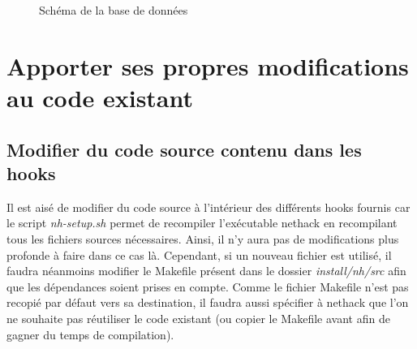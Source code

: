 \documentclass[10pt,a4paper]{report}
\begin{document}
\begin{figure}[H]
	\caption{\label{fig:database} Schéma de la base de données}
\end{figure}

\chapter{Apporter ses propres modifications au code existant}
\section{Modifier du code source contenu dans les hooks}
Il est aisé de modifier du code source à l'intérieur des différents hooks
fournis car le script \emph{nh-setup.sh} permet de recompiler l'exécutable
nethack en recompilant tous les fichiers sources nécessaires. Ainsi, il n'y aura
pas de modifications plus profonde à faire dans ce cas là. Cependant, si un
nouveau fichier est utilisé, il faudra néanmoins modifier le Makefile présent
dans le dossier \emph{install/nh/src} afin que les dépendances soient prises en
compte. Comme le fichier Makefile n'est pas recopié par défaut vers sa
destination, il faudra aussi spécifier à nethack que l'on ne souhaite pas
réutiliser le code existant (ou copier le Makefile avant afin de gagner du temps
de compilation).
\end{document}
